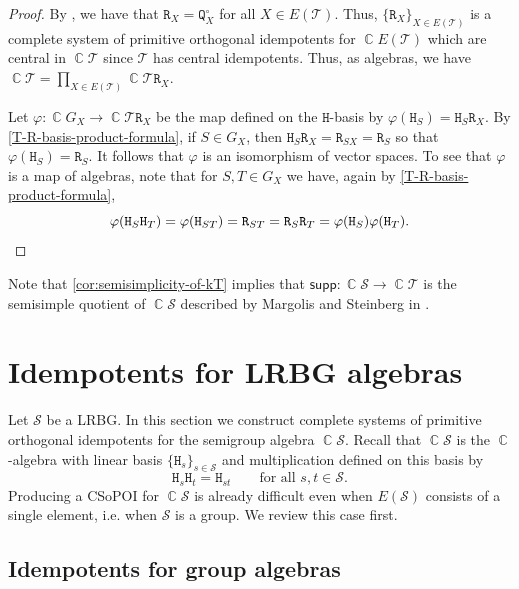 \documentclass[11pt, oneside, reqno]{amsart}
\theoremstyle{definition}
\numberwithin{equation}{section}
\DeclareMathOperator{\C}{\mathbb{C}}
\def \SS{{\mathcal{S}}}
\def \TT{{\mathcal{T}}}
\def \kk{\C}
\def \supp{\mathsf{supp}}
\newcommand{\B}[1]{\mathtt{#1}} 			%
\begin{document}
\begin{proof}
    By , we have that
    $\B{R}_{X} = \B{Q}^\circ_{X}$ for all $X \in E(\TT)$.
    Thus, $\{ \B{R}_{X} \}_{X \in E(\TT)}$ is a complete system of primitive
    orthogonal idempotents for $\kk E(\TT)$ which are central in $\kk \TT$
    since $\TT$ has central idempotents. Thus, as algebras, we have
    $\kk \TT = \prod_{X \in E(\TT)} \kk \TT \B{R}_{X}$.

    Let $\varphi: \kk G_{X} \xrightarrow{} \kk \TT \B{R}_{X}$
    be the map defined on the $\B{H}$-basis by $\varphi(\B{H}_{S}) = \B{H}_{S} \B{R}_{X}$.
    By \cref{T-R-basis-product-formula},
    if $S \in G_{X}$, then $\B{H}_{S} \B{R}_{X} = \B{R}_{SX} = \B{R}_{S}$
    so that $\varphi(\B{H}_{S}) = \B{R}_{S}$.
    It follows that $\varphi$ is an isomorphism of vector spaces.
    To see that $\varphi$ is a map of algebras, note that
    for $S, T \in G_{X}$ we have, again by \cref{T-R-basis-product-formula},
    \begin{equation*}
        \varphi(\B{H}_{S} \B{H}_{T})
        = \varphi(\B{H}_{ST})
        = \B{R}_{ST}
        = \B{R}_{S} \B{R}_{T}
        = \varphi(\B{H}_{S}) \varphi(\B{H}_{T}).
        \qedhere
    \end{equation*}
\end{proof}

Note that \cref{cor:semisimplicity-of-kT} implies  that $\supp : \kk\SS \to \kk\TT$ is the semisimple quotient of $\kk
\SS$ described by Margolis and Steinberg in \citep[\S~5.2.1]{ms11HomologySemigroups}.

\section{Idempotents for LRBG algebras}\label{sec:idemforLRBGs}

Let $\SS$ be a LRBG.
In this section we construct complete systems of primitive orthogonal idempotents for the semigroup algebra $\kk \SS$.
Recall that $\kk \SS$ is the $\kk$-algebra with linear basis $\{ \B{H}_s \}_{s \in \SS}$ and multiplication defined on this basis by
\[
    \B{H}_s\B{H}_t = \B{H}_{st}
    \qquad
    \text{for all } s,t \in \SS.
\]
Producing a CSoPOI for $\kk \SS$ is already difficult even when $E(\SS)$ consists of a single element, i.e. when $\SS$ is a group.
We review this case first.

\subsection{Idempotents for group algebras}\label{ss:isotypic}
\end{document}
